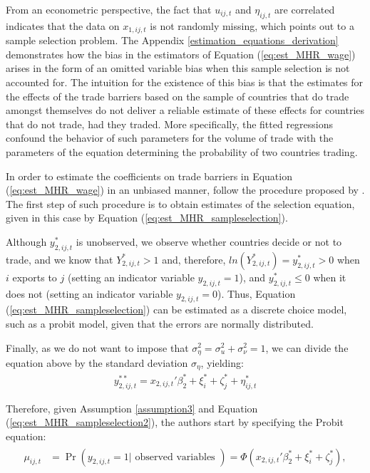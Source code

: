 From an econometric perspective, the fact that $u_{ij,t}$ and $\eta_{ij,t}$ are correlated indicates that the data on $x_{1,ij,t}$ is not randomly missing, which points out to a sample selection problem. The Appendix \ref{estimation_equations_derivation} demonstrates how the bias in the estimators of Equation (\ref{eq:est_MHR_wage}) arises in the form of an omitted variable bias when this sample selection is not accounted for. The intuition for the existence of this bias is that the estimates for the effects of the trade barriers based on the sample of countries that do trade amongst themselves do not deliver a reliable estimate of these effects for countries that do not trade, had they traded. More specifically, the fitted regressions confound the behavior of such parameters for the volume of trade with the parameters of the equation determining the probability of two countries trading.

In order to estimate the coefficients on trade barriers in Equation (\ref{eq:est_MHR_wage}) in an unbiased manner, \cite{helpman2008estimating} follow the procedure proposed by \cite{heckman1979sample}. The first step of such procedure is to obtain estimates of the selection equation, given in this case by Equation (\ref{eq:est_MHR_sampleselection}).

Although $y_{2,i j,t}^*$ is unobserved, we observe whether countries decide or not to trade, and we know that $Y_{2,ij,t}^* > 1$ and,  therefore, $ln(Y_{2,ij,t}^* ) = y_{2,i j,t}^* > 0$ when $i$ exports to $j$ (setting an indicator variable $y_{2,ij,t} = 1$), and $y_{2,i j,t}^* \leq 0$ when it does not (setting an indicator variable $y_{2,ij,t} = 0$). Thus, Equation (\ref{eq:est_MHR_sampleselection}) can be estimated as a discrete choice model, such as a probit model, given that the errors are normally distributed.

Finally, as we do not want to impose that $\sigma_\eta^2 = \sigma_u^2 + \sigma_\nu^2 = 1$, we can divide the equation above by the standard deviation $\sigma_\eta$, yielding:
\begin{align}
    y_{2,ij,t}^{**}= x_{2,ij,t}'\beta_2^* +\xi_{i}^*+\zeta_{j}^*+\eta_{ij,t}^*
    \label{eq:est_MHR_sampleselection2}
\end{align}

Therefore, given Assumption \ref{assumption3} and Equation (\ref{eq:est_MHR_sampleselection2}), the authors start by specifying the Probit equation:
\begin{align}
\begin{aligned}
\mu_{i j,t} &=\operatorname{Pr}\left(y_{2,i j,t}=1 | \text { observed variables }\right) =\Phi\left(x_{2,ij,t}'\beta_2^*  +\xi_{i}^*+\zeta_{j}^*\right),
\end{aligned}
\label{eq:est_MHR_sampleselection2_probit}  
\end{align}

